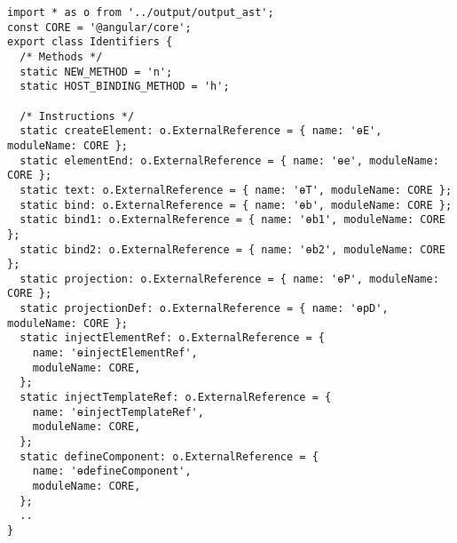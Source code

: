 \begin{verbatim}
import * as o from '../output/output_ast';
const CORE = '@angular/core';
export class Identifiers {
  /* Methods */
  static NEW_METHOD = 'n';
  static HOST_BINDING_METHOD = 'h';

  /* Instructions */
  static createElement: o.ExternalReference = { name: 'ɵE', moduleName: CORE };
  static elementEnd: o.ExternalReference = { name: 'ɵe', moduleName: CORE };
  static text: o.ExternalReference = { name: 'ɵT', moduleName: CORE };
  static bind: o.ExternalReference = { name: 'ɵb', moduleName: CORE };
  static bind1: o.ExternalReference = { name: 'ɵb1', moduleName: CORE };
  static bind2: o.ExternalReference = { name: 'ɵb2', moduleName: CORE };
  static projection: o.ExternalReference = { name: 'ɵP', moduleName: CORE };
  static projectionDef: o.ExternalReference = { name: 'ɵpD', moduleName: CORE };
  static injectElementRef: o.ExternalReference = {
    name: 'ɵinjectElementRef',
    moduleName: CORE,
  };
  static injectTemplateRef: o.ExternalReference = {
    name: 'ɵinjectTemplateRef',
    moduleName: CORE,
  };
  static defineComponent: o.ExternalReference = {
    name: 'ɵdefineComponent',
    moduleName: CORE,
  };
  ..
}
\end{verbatim}
